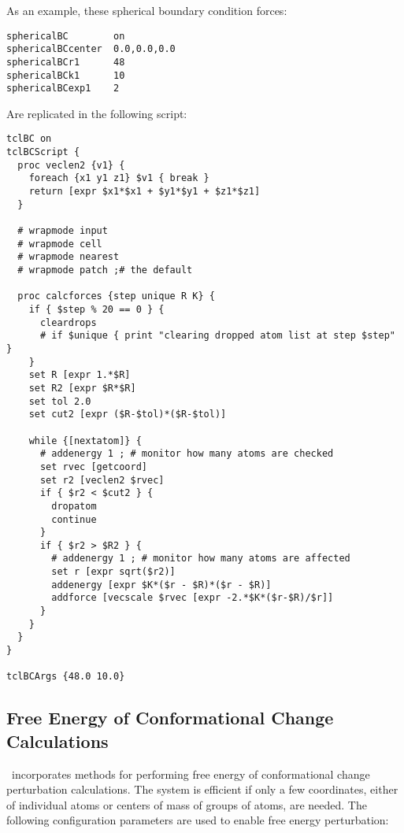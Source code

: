 As an example, these spherical boundary condition forces:

\begin{verbatim}
sphericalBC        on
sphericalBCcenter  0.0,0.0,0.0
sphericalBCr1      48
sphericalBCk1      10
sphericalBCexp1    2
\end{verbatim}

Are replicated in the following script:

\begin{verbatim}
tclBC on
tclBCScript {
  proc veclen2 {v1} {
    foreach {x1 y1 z1} $v1 { break }
    return [expr $x1*$x1 + $y1*$y1 + $z1*$z1]
  }

  # wrapmode input
  # wrapmode cell
  # wrapmode nearest
  # wrapmode patch ;# the default

  proc calcforces {step unique R K} {
    if { $step % 20 == 0 } {
      cleardrops
      # if $unique { print "clearing dropped atom list at step $step" }
    }
    set R [expr 1.*$R]
    set R2 [expr $R*$R]
    set tol 2.0
    set cut2 [expr ($R-$tol)*($R-$tol)]

    while {[nextatom]} {
      # addenergy 1 ; # monitor how many atoms are checked
      set rvec [getcoord]
      set r2 [veclen2 $rvec]
      if { $r2 < $cut2 } {
        dropatom
        continue
      }
      if { $r2 > $R2 } {
        # addenergy 1 ; # monitor how many atoms are affected
        set r [expr sqrt($r2)]
        addenergy [expr $K*($r - $R)*($r - $R)]
        addforce [vecscale $rvec [expr -2.*$K*($r-$R)/$r]]
      }
    }
  }
}

tclBCArgs {48.0 10.0}
\end{verbatim}


\subsection{Free Energy of Conformational Change Calculations}
\label{section:fenergy}

\NAMD\ incorporates methods for performing free energy of conformational change perturbation calculations.
The system is efficient if only a few coordinates, either of individual atoms or centers of mass of groups of atoms, are needed.
The following configuration parameters are used to enable free energy perturbation:

